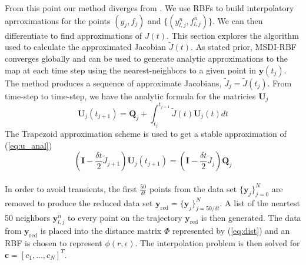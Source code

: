                 From this point our method diverges from \cite{item:5}. We use RBFs to build interpolatory aprroximations
                for the points $(y_j, f_j)$ and $\{(y_{l,j}^n, f_{l,j}^n)\}$. We can then differentiate
                to find approximations of $J(t)$. This section explores the algorithm used to calculate the approximated Jacobian $\tilde{J}(t)$.
                As stated prior, MSDI-RBF converges
                globally and can be used to generate analytic approximations to the map at each time step using the
                nearest-neighbors to a given point in $\mathbf{y}(t_j)$. The method produces a sequence of approximate Jacobians,
                $\tilde{J}_j=\tilde{J}(t_j)$. From time-step to time-step, we have the analytic formula for the matricies
                $\mathbf{U}_j$
                \begin{equation}\label{eq:u_anal}
                    \mathbf{U}_j(t_{j+1})=\mathbf{Q}_j+\int_{t_j}^{t_{j+1}}\tilde{J}(t)\mathbf{U}_j(t)dt
                \end{equation}
                The Trapezoid approximation scheme is used to get a stable approximation of (\ref{eq:u_anal})
                \begin{equation}
                    \left(\mathbf{I}-\frac{\delta t}{2}\tilde{J}_{j+1}\right)\mathbf{U}_j\left(t_{j+1}\right)=
                    \left(\mathbf{I}-\frac{\delta t}{2}\tilde{J}_{j}\right)\mathbf{Q}_j
                \end{equation}\\

                    In order to avoid transients, the first $\frac{50}{\delta t}$ points from the data set $\{\mathbf{y}_j\}_{j=0}^N$
                    are removed to produce the reduced data set $\mathbf{y}_{\text{red}}=\{\mathbf{y}_j\}_{j=50/\delta t}^N$.
                    A list of the neartest 50 neighbors $\mathbf{y}_{l,j}^n$ to every point on the trajectory $\mathbf{y}_{\text{red}}$ is then generated.
                    The data from $\mathbf{y}_{\text{red}}$ is placed into the distance matrix $\Phi$ represented by (\ref{eq:dist})
                    and an RBF is chosen to represent $\phi(r,\epsilon)$. The interpolation problem is then solved for $\mathbf{c}=[c_1,...,c_N]^T$.\\

